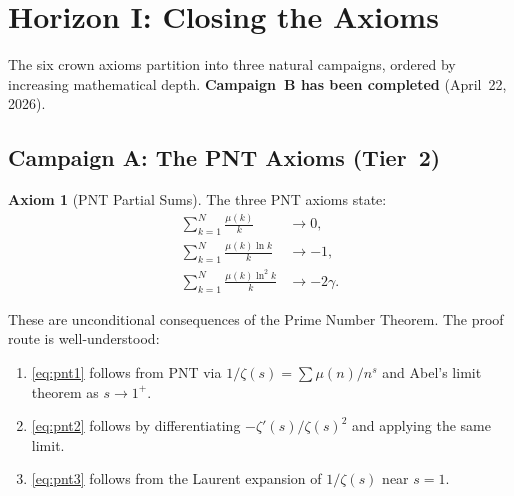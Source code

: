 \documentclass[11pt,a4paper]{article}
\theoremstyle{definition}
\newtheorem{axiombox}[definition]{Axiom}
\begin{document}
\section{Horizon I: Closing the Axioms}
\label{sec:axioms}

The six crown axioms partition into three natural campaigns, ordered
by increasing mathematical depth. \textbf{Campaign~B has been completed}
(April~22, 2026).

\subsection{Campaign A: The PNT Axioms (Tier~2)}

\begin{axiombox}[PNT Partial Sums]
\label{ax:pnt}
The three PNT axioms state:
\begin{align}
  \sum_{k=1}^{N} \frac{\mu(k)}{k} &\to 0, \label{eq:pnt1} \\
  \sum_{k=1}^{N} \frac{\mu(k)\ln k}{k} &\to -1, \label{eq:pnt2} \\
  \sum_{k=1}^{N} \frac{\mu(k)\ln^2 k}{k} &\to -2\gamma. \label{eq:pnt3}
\end{align}
\end{axiombox}

These are unconditional consequences of the Prime Number Theorem.
The proof route is well-understood:

\begin{enumerate}
  \item \eqref{eq:pnt1} follows from PNT via
    $1/\zeta(s) = \sum \mu(n)/n^s$ and Abel's limit theorem as $s \to 1^+$.
  \item \eqref{eq:pnt2} follows by differentiating $-\zeta'(s)/\zeta(s)^2$
    and applying the same limit.
  \item \eqref{eq:pnt3} follows from the Laurent expansion of $1/\zeta(s)$
    near $s = 1$.
\end{enumerate}
\end{document}
